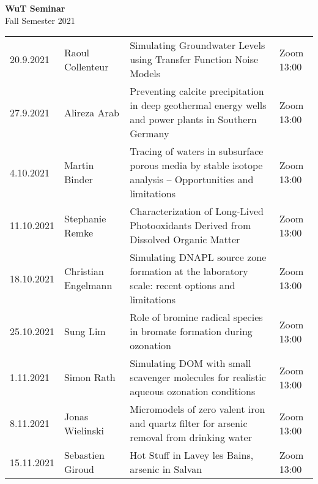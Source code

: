 \documentclass[12pt]{article}
\begin{document}
\centering

{\Huge \bf WuT Seminar}\\[1cm]
{\Large Fall Semester 2021}\\[1.8cm]

\renewcommand*\arraystretch{1.8}
\begin{tabular}{l p{3.2cm} p{9cm} p{2cm}}

20.9.2021
	& Raoul Collenteur 
	& Simulating Groundwater Levels using Transfer Function Noise Models
	& Zoom 13:00\\

27.9.2021
	& Alireza Arab
	& Preventing calcite precipitation in deep geothermal energy wells and power plants in Southern Germany
	& Zoom 13:00\\

4.10.2021
	& Martin Binder
	& Tracing of waters in subsurface porous media by stable isotope analysis -- Opportunities and limitations
	& Zoom 13:00\\

11.10.2021
	& Stephanie Remke
	& Characterization of Long-Lived Photooxidants Derived from Dissolved Organic Matter
	& Zoom 13:00\\

18.10.2021
	& Christian Engelmann
	& Simulating DNAPL source zone formation at the laboratory scale: recent options and limitations
	& Zoom 13:00\\
	
25.10.2021
	& Sung Lim
	& Role of bromine radical species in bromate formation during ozonation
	& Zoom 13:00\\
	
1.11.2021
	& Simon Rath
	& Simulating DOM with small scavenger molecules for realistic aqueous ozonation conditions
	& Zoom 13:00\\
	
8.11.2021
	& Jonas Wielinski
	& Micromodels of zero valent iron and quartz filter for arsenic removal from drinking water
	& Zoom 13:00\\
	
15.11.2021
	& Sebastien Giroud
	& Hot Stuff in Lavey les Bains, arsenic in Salvan
	& Zoom 13:00\\


\end{tabular}
\end{document}
